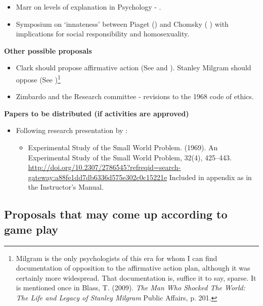 \begin{refsection}
\begin{itemize}
\item Marr on levels of explanation in Psychology - .

\item Symposium on ‘innateness’ between Piaget () and Chomsky ( ) with implications for social responsibility and homosexuality.

\end{itemize}

\textbf{Other possible proposals}

\begin{itemize}
\item Clark should propose affirmative action (See  and ). Stanley Milgram should oppose (See )\footnote{Milgram is the only psychologists of this era for whom I can find documentation of opposition to the affirmative action plan, although it was certainly more widespread. That documentation is, suffice it to say, sparse. It is mentioned once in Blass, T. (2009). \emph{The Man Who Shocked The World: The Life and Legacy of Stanley Milgram} Public Affairs, p. 201.}

\item Zimbardo and the Research committee - revisions to the 1968 code of ethics.

\end{itemize}

\textbf{Papers to be distributed (if activities are approved)}

\begin{itemize}
\item Following research presentation by :

\begin{itemize}
\item Experimental Study of the Small World Problem. (1969). An Experimental Study of the Small World Problem, 32(4), 425–443. \url{http://doi.org/10.2307/2786545?refreqid=search-gateway:a88fe1dd7db6336d575e302c0c15221e} Included in appendix as  in the Instructor's Manual.

\end{itemize}

\end{itemize}

\newpage

\subsection{Proposals that may come up according to game play}
\label{proposalsthatmaycomeupaccordingtogameplay}


\end{refsection}
